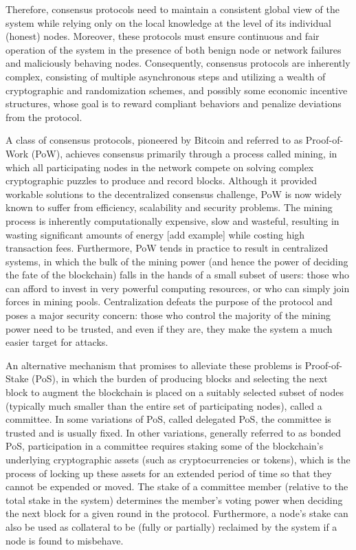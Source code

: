 Therefore, consensus protocols need to maintain a consistent global view of the system while relying only on the local knowledge at the level of its individual (honest) nodes. Moreover, these protocols must ensure continuous and fair operation of the system in the presence of both benign node or network failures and maliciously behaving nodes. Consequently, consensus protocols are inherently complex, consisting of multiple asynchronous steps and utilizing a wealth of cryptographic and randomization schemes, and possibly some economic incentive structures, whose goal is to reward compliant behaviors and penalize deviations from the protocol.

A class of consensus protocols, pioneered by Bitcoin and referred to as Proof-of-Work (PoW), achieves consensus primarily through a process called mining, in which all participating nodes in the network compete on solving complex cryptographic puzzles to produce and record blocks. Although it provided workable solutions to the decentralized consensus challenge, PoW is now widely known to suffer from efficiency, scalability and security problems. The mining process is inherently computationally expensive, slow and wasteful, resulting in wasting significant amounts of energy [add example] while costing high transaction fees. Furthermore, PoW tends in practice to result in centralized systems, in which the bulk of the mining power (and hence the power of deciding the fate of the blockchain) falls in the hands of a small subset of users: those who can afford to invest in very powerful computing resources, or who can simply join forces in mining pools. Centralization defeats the purpose of the protocol and poses a major security concern: those who control the majority of the mining power need to be trusted, and even if they are, they make the system a much easier target for attacks. 

An alternative mechanism that promises to alleviate these problems is Proof-of-Stake (PoS), in which the burden of producing blocks and selecting the next block to augment the blockchain is placed on a suitably selected subset of nodes (typically much smaller than the entire set of participating nodes), called a committee. In some variations of PoS, called delegated PoS, the committee is trusted and is usually fixed. In other variations, generally referred to as bonded PoS, participation in a committee requires staking some of the blockchain's underlying cryptographic assets (such as cryptocurrencies or tokens), which is the process of locking up these assets for an extended period of time so that they cannot be expended or moved. The stake of a committee member (relative to the total stake in the system) determines the member's voting power when deciding the next block for a given round in the protocol. Furthermore, a node's stake can also be used as collateral to be (fully or partially) reclaimed by the system if a node is found to misbehave.

